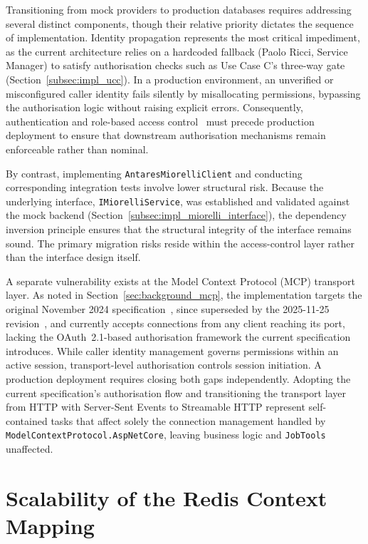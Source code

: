 Transitioning from mock providers to production databases requires addressing several distinct components, though their relative priority dictates the sequence of implementation. Identity propagation represents the most critical impediment, as the current architecture relies on a hardcoded fallback (Paolo Ricci, Service Manager) to satisfy authorisation checks such as Use Case C's three-way gate (Section~\ref{subsec:impl_ucc}). In a production environment, an unverified or misconfigured caller identity fails silently by misallocating permissions, bypassing the authorisation logic without raising explicit errors. Consequently, authentication and role-based access control~\cite{sandhu1996rbac} must precede production deployment to ensure that downstream authorisation mechanisms remain enforceable rather than nominal.

By contrast, implementing \texttt{AntaresMiorelliClient} and conducting corresponding integration tests involve lower structural risk. Because the underlying interface, \texttt{IMiorelliService}, was established and validated against the mock backend (Section~\ref{subsec:impl_miorelli_interface}), the dependency inversion principle ensures that the structural integrity of the interface remains sound. The primary migration risks reside within the access-control layer rather than the interface design itself.

A separate vulnerability exists at the Model Context Protocol (MCP) transport layer. As noted in Section~\ref{sec:background_mcp}, the implementation targets the original November 2024 specification~\cite{anthropic2024mcp}, since superseded by the 2025-11-25 revision~\cite{mcp2025specnov}, and currently accepts connections from any client reaching its port, lacking the OAuth~2.1-based authorisation framework the current specification introduces. While caller identity management governs permissions within an active session, transport-level authorisation controls session initiation. A production deployment requires closing both gaps independently. Adopting the current specification's authorisation flow and transitioning the transport layer from HTTP with Server-Sent Events to Streamable HTTP represent self-contained tasks that affect solely the connection management handled by \texttt{ModelContextProtocol.AspNetCore}, leaving business logic and \texttt{JobTools} unaffected.

\section{Scalability of the Redis Context Mapping}
\label{sec:discussion_redis_scalability}

